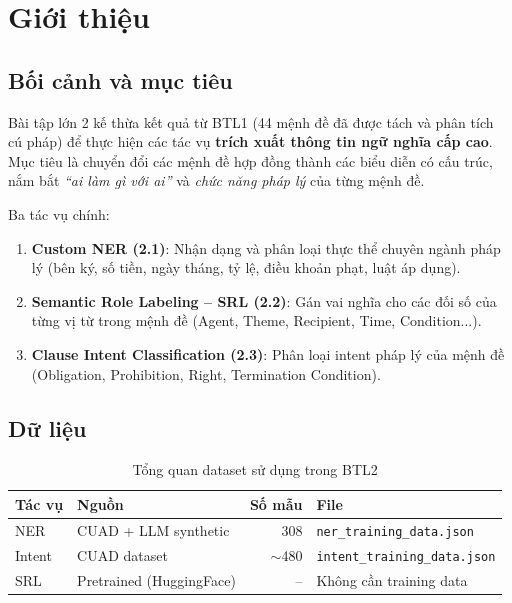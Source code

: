 \section{Giới thiệu}

\subsection{Bối cảnh và mục tiêu}

Bài tập lớn 2 kế thừa kết quả từ BTL1 (44 mệnh đề đã được tách và phân tích cú pháp) để thực hiện các tác vụ \textbf{trích xuất thông tin ngữ nghĩa cấp cao}. Mục tiêu là chuyển đổi các mệnh đề hợp đồng thành các biểu diễn có cấu trúc, nắm bắt \textit{``ai làm gì với ai''} và \textit{chức năng pháp lý} của từng mệnh đề.

Ba tác vụ chính:
\begin{enumerate}
    \item \textbf{Custom NER (2.1)}: Nhận dạng và phân loại thực thể chuyên ngành pháp lý (bên ký, số tiền, ngày tháng, tỷ lệ, điều khoản phạt, luật áp dụng).
    \item \textbf{Semantic Role Labeling -- SRL (2.2)}: Gán vai nghĩa cho các đối số của từng vị từ trong mệnh đề (Agent, Theme, Recipient, Time, Condition...).
    \item \textbf{Clause Intent Classification (2.3)}: Phân loại intent pháp lý của mệnh đề (Obligation, Prohibition, Right, Termination Condition).
\end{enumerate}

\subsection{Dữ liệu}

\begin{table}[H]
    \centering
    \caption{Tổng quan dataset sử dụng trong BTL2}
    \label{tab:dataset_overview}
    \begin{tabular}{|l|l|r|l|}
        \hline
        \textbf{Tác vụ} & \textbf{Nguồn} & \textbf{Số mẫu} & \textbf{File} \\ \hline
        NER & CUAD + LLM synthetic & 308 & \texttt{ner\_training\_data.json} \\ \hline
        Intent & CUAD dataset & $\sim$480 & \texttt{intent\_training\_data.json} \\ \hline
        SRL & Pretrained (HuggingFace) & -- & Không cần training data \\ \hline
    \end{tabular}
\end{table}

